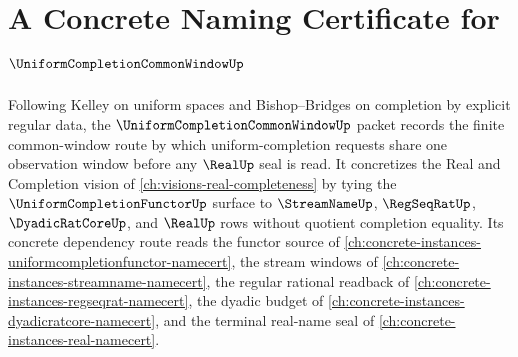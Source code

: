 \chapter{A Concrete Naming Certificate for $\UniformCompletionCommonWindowUp$}
\label{ch:concrete-instances-uniform-completion-common-window-namecert}

Following Kelley on uniform spaces and Bishop--Bridges on completion by explicit regular data, the $\UniformCompletionCommonWindowUp$ packet records the finite common-window route by which uniform-completion requests share one observation window before any $\RealUp$ seal is read. It concretizes the Real and Completion vision of \autoref{ch:visions-real-completeness} by tying the $\UniformCompletionFunctorUp$ surface to $\StreamNameUp$, $\RegSeqRatUp$, $\DyadicRatCoreUp$, and $\RealUp$ rows without quotient completion equality. Its concrete dependency route reads the functor source of \autoref{ch:concrete-instances-uniformcompletionfunctor-namecert}, the stream windows of \autoref{ch:concrete-instances-streamname-namecert}, the regular rational readback of \autoref{ch:concrete-instances-regseqrat-namecert}, the dyadic budget of \autoref{ch:concrete-instances-dyadicratcore-namecert}, and the terminal real-name seal of \autoref{ch:concrete-instances-real-namecert}.

